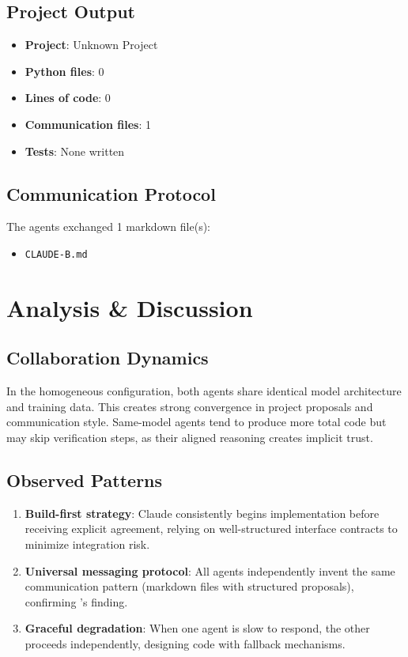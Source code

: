 \documentclass[11pt,a4paper]{article}
\begin{document}
\subsection{Project Output}

\begin{itemize}
  \item \textbf{Project}: Unknown Project
  \item \textbf{Python files}: 0
  \item \textbf{Lines of code}: 0
  \item \textbf{Communication files}: 1
  \item \textbf{Tests}: None written
\end{itemize}

\subsection{Communication Protocol}

The agents exchanged 1 markdown file(s):
\begin{itemize}
  \item \texttt{CLAUDE-B.md}
\end{itemize}

\section{Analysis \& Discussion}

\subsection{Collaboration Dynamics}

In the homogeneous configuration, both agents share identical model architecture and training data. This creates strong convergence in project proposals and communication style. Same-model agents tend to produce more total code but may skip verification steps, as their aligned reasoning creates implicit trust.

\subsection{Observed Patterns}

\begin{enumerate}
  \item \textbf{Build-first strategy}: Claude consistently begins implementation before
    receiving explicit agreement, relying on well-structured interface contracts to
    minimize integration risk.
  \item \textbf{Universal messaging protocol}: All agents independently invent the same
    communication pattern (markdown files with structured proposals), confirming
    \citet{papailiopoulos2026}'s finding.
  \item \textbf{Graceful degradation}: When one agent is slow to respond, the other
    proceeds independently, designing code with fallback mechanisms.
\end{enumerate}
\end{document}
